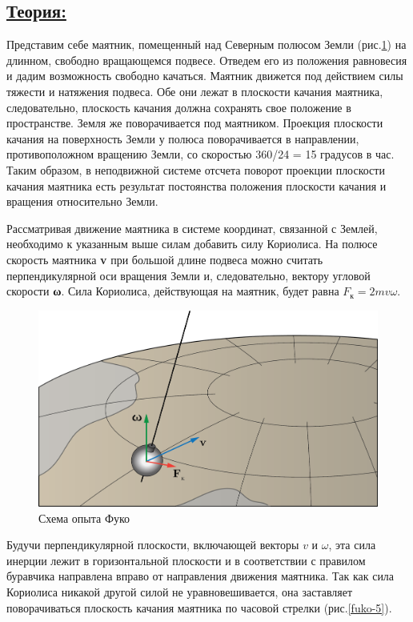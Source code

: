\documentclass[14pt,a4paper,oneside]{extarticle}	%
\begin{document}
	\subsection*{\underline{Теория:}}
	
	Представим себе маятник, помещенный над Северным полюсом Земли (рис.\ref{fuko-4}) на длинном, свободно вращающемся подвесе.
	Отведем его из положения равновесия и дадим возможность свободно качаться.
	Маятник движется под действием силы тяжести и натяжения подвеса.
	Обе они лежат в плоскости качания маятника, следовательно, плоскость качания должна сохранять свое положение в пространстве.
	Земля же поворачивается под маятником.
	Проекция плоскости качания на поверхность Земли у полюса поворачивается в направлении, противоположном вращению Земли, со скоростью 360/24 = 15 градусов в час.
	Таким образом, в неподвижной системе отсчета поворот проекции плоскости качания маятника есть результат постоянства положения плоскости качания и вращения относительно Земли.

	Рассматривая движение маятника в системе координат, связанной с Землей, необходимо к указанным выше силам добавить силу Кориолиса.
	На полюсе скорость маятника \textbf{v} при большой длине подвеса можно считать перпендикулярной оси вращения Земли и, следовательно, вектору угловой скорости \textbf{ω}.
	Сила Кориолиса, действующая на маятник, будет равна 
	$ F_{\text{к}} = 2mv\omega $.
	
		\begin{figure}[H] 	
		\centering 	
		\includegraphics[width=0.7\linewidth]{fuko-4.png}
		\caption{Схема опыта Фуко}
		\label{fuko-4}
	\end{figure}
	
	
	Будучи перпендикулярной плоскости, включающей векторы $ v $  и $ \omega $, эта сила инерции лежит в горизонтальной плоскости и в соответствии с правилом буравчика направлена вправо от направления движения маятника. 
	Так как сила Кориолиса никакой другой силой не уравновешивается, она заставляет поворачиваться плоскость качания маятника по часовой стрелки (рис.\ref{fuko-5}).
\end{document}
